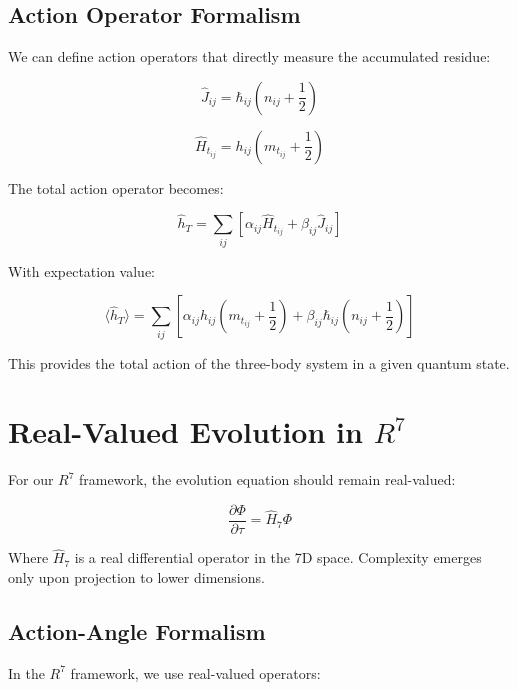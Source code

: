 \documentclass{article}
\begin{document}
\subsection{Action Operator Formalism}

We can define action operators that directly measure the accumulated residue:

\begin{equation}
\hat{J}_{ij} = \hbar_{ij}\left(n_{ij} + \frac{1}{2}\right)
\end{equation}

\begin{equation}
\hat{H}_{t_{ij}} = h_{ij}\left(m_{t_{ij}} + \frac{1}{2}\right)
\end{equation}

The total action operator becomes:

\begin{equation}
\hat{h}_T = \sum_{ij} \left[\alpha_{ij}\hat{H}_{t_{ij}} + \beta_{ij}\hat{J}_{ij}\right]
\end{equation}

With expectation value:

\begin{equation}
\langle \hat{h}_T \rangle = \sum_{ij} \left[\alpha_{ij}h_{ij}\left(m_{t_{ij}} + \frac{1}{2}\right) + \beta_{ij}\hbar_{ij}\left(n_{ij} + \frac{1}{2}\right)\right]
\end{equation}

This provides the total action of the three-body system in a given quantum state.

\section{Real-Valued Evolution in $R^7$}

For our $R^7$ framework, the evolution equation should remain real-valued:

\begin{equation}
\frac{\partial \Phi}{\partial \tau} = \hat{H}_7 \Phi
\end{equation}

Where $\hat{H}_7$ is a real differential operator in the 7D space. Complexity emerges only upon projection to lower dimensions.

\subsection{Action-Angle Formalism}

In the $R^7$ framework, we use real-valued operators:
\end{document}
